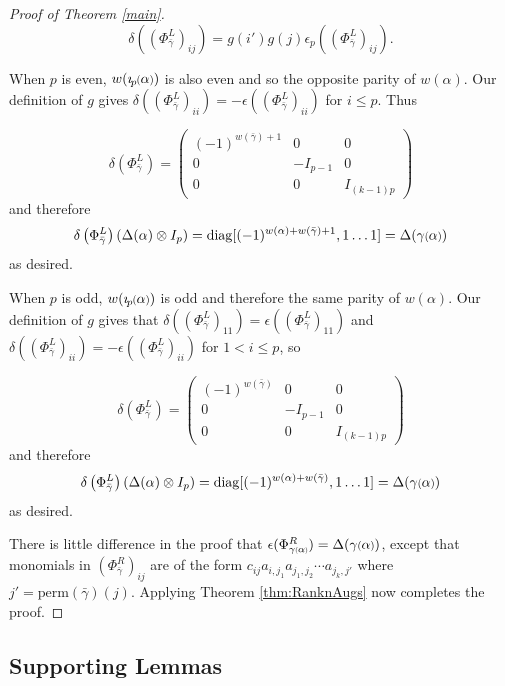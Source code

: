 \documentclass[11pt]{amsart}
\newcommand*{\smallp}[1]{\scalebox{.75}{\ensuremath#1}}
\newcommand*{\subsmallp}[1]{\scalebox{.5}{\ensuremath#1}}
\newcommand{\pp}[2][p]{\imath_{\hspace*{-1pt}#1}\hspace*{-.5pt}\smallp(#2\smallp)}
\newcommand\diag{\operatorname{diag}}
\theoremstyle{definition}
\begin{document}
\begin{proof}[Proof of Theorem \ref{main}]
$$\delta\left(\left(\Phi_{\bar\gamma}^L\right)_{ij}\right) = g(i')g(j)\epsilon_p\left(\left(\Phi_{\bar\gamma}^L\right)_{ij}\right).$$

When $p$ is even, $w(\pp\alpha)$ is also even and so the opposite parity of $w(\alpha)$. Our definition of $g$ gives $\delta\left(\left(\Phi_{\bar\gamma}^L\right)_{ii}\right) = -\epsilon\left(\left(\Phi_{\bar\gamma}^L\right)_{ii}\right)$ for $i\le p$. Thus 

$$\delta\left(\Phi_{\bar\gamma}^L\right) = 
\left( \begin{array}{ccc}
(-1)^{w(\bar\gamma)+1} & 0 & 0 \\
0 & -I_{p-1} & 0 \\
0 & 0 & I_{(k-1)p} \end{array} \right)
$$
\noindent and therefore
$$
\delta\left(\Phi_{\bar\gamma}^L\right)\left(\Delta(\alpha)\otimes I_p\right) = \diag[(-1)^{w(\alpha) + w(\bar\gamma) + 1},1\ldots 1] = \Delta(\gamma\smallp(\alpha\smallp))
$$
\noindent as desired.

When $p$ is odd, $w(\pp\alpha)$ is odd and therefore the same parity of $w(\alpha)$. Our definition of $g$ gives that $\delta\left(\left(\Phi_{\bar\gamma}^L\right)_{11}\right) = \epsilon\left(\left(\Phi_{\bar\gamma}^L\right)_{11}\right)$ and $\delta\left(\left(\Phi_{\bar\gamma}^L\right)_{ii}\right) = -\epsilon\left(\left(\Phi_{\bar\gamma}^L\right)_{ii}\right)$ for $1<i\le p$, so 

$$\delta\left(\Phi_{\bar\gamma}^L\right) = 
\left( \begin{array}{ccc}
(-1)^{w(\bar\gamma)} & 0 & 0 \\
0 & -I_{p-1} & 0 \\
0 & 0 & I_{(k-1)p} \end{array} \right)
$$
\noindent and therefore
$$
\delta\left(\Phi_{\bar\gamma}^L\right)\left(\Delta(\alpha)\otimes I_p\right)= \diag[(-1)^{w(\alpha) + w(\bar\gamma)},1\ldots 1] = \Delta(\gamma\smallp(\alpha\smallp))
$$
\noindent as desired. 

There is little difference in the proof that $\epsilon(\Phi_{\gamma\subsmallp(\alpha\subsmallp)}^R) = \Delta(\gamma\smallp(\alpha\smallp))$, except that monomials in $(\Phi_{\bar\gamma}^R)_{ij}$ are of the form $c_{ij}a_{i,j_1}a_{j_1,j_2}\cdots a_{j_k,j'}$ where $j'=\text{perm}(\bar\gamma)(j)$. Applying Theorem \ref{thm:RanknAugs} now completes the proof.
\end{proof}


\subsection{Supporting Lemmas}
\label{PropAndLemmas}
\end{document}
